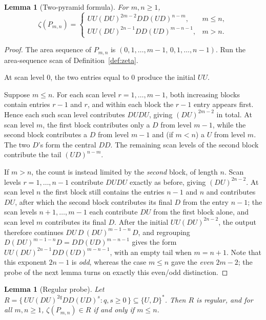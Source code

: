 \documentclass[11pt]{article}
\newtheorem{lemma}[theorem]{Lemma}
\theoremstyle{definition}
\begin{document}
\begin{lemma}[Two-pyramid formula]\label{lem:zeta-two-pyramid}
For $m,n\ge 1$,
\[
\zeta(P_{m,n})=
\begin{cases}
   UU(DU)^{2m-2}DD(UD)^{n-m}, & m\le n,\\[1mm]
   UU(DU)^{2n-1}DD(UD)^{m-n-1}, & m>n.
\end{cases}
\]
\end{lemma}

\begin{proof}
The area sequence of $P_{m,n}$ is
\(
   (0,1,\ldots,m-1,\,0,1,\ldots,n-1).
\)
Run the area-sequence scan of Definition~\ref{def:zeta}.

At scan level $0$, the two entries equal to $0$ produce the initial $UU$.

Suppose $m\le n$.  For each scan level $r=1,\ldots,m-1$, both increasing blocks
contain entries $r-1$ and $r$, and within each block the $r-1$ entry
appears first.  Hence each such scan level contributes $DUDU$, giving
$(DU)^{2m-2}$ in total.  At scan level $m$, the first block contributes only a
$D$ from level $m-1$, while the second block contributes a $D$ from level
$m-1$ and (if $m<n$) a $U$ from level $m$.  The two $D$'s form the central
$DD$.  The remaining scan levels of the second block contribute the tail
$(UD)^{n-m}$.

If $m>n$, the count is instead limited by the \emph{second} block, of length
$n$.  Scan levels $r=1,\ldots,n-1$ contribute $DUDU$ exactly as before, giving
$(DU)^{2n-2}$.  At scan level $n$ the first block still contains the entries $n-1$
and $n$ and contributes $DU$, after which the second block contributes its
final $D$ from the entry $n-1$; the scan levels $n+1,\ldots,m-1$ each contribute
$DU$ from the first block alone, and scan level $m$ contributes its final $D$.  After the
initial $UU(DU)^{2n-2}$, the output therefore continues
$DU\,D\,(DU)^{m-1-n}\,D$, and regrouping $D(DU)^{m-1-n}D=DD(UD)^{m-n-1}$ gives
the form $UU(DU)^{2n-1}DD(UD)^{m-n-1}$, with an empty tail when
$m=n+1$.  Note that this exponent $2n-1$ is \emph{odd}, whereas the
case $m\le n$ gave the \emph{even} $2m-2$; the probe of the next lemma turns on
exactly this even/odd distinction.
\end{proof}

\begin{lemma}[Regular probe]\label{lem:zeta-probe}
Let $R = \{\,UU(DU)^{2q}DD(UD)^s : q,s\ge 0\,\}\subseteq\{U,D\}^*$.
Then $R$ is regular, and for all $m,n\ge 1$,
$\zeta(P_{m,n})\in R$ if and only if $m\le n$.
\end{lemma}
\end{document}
